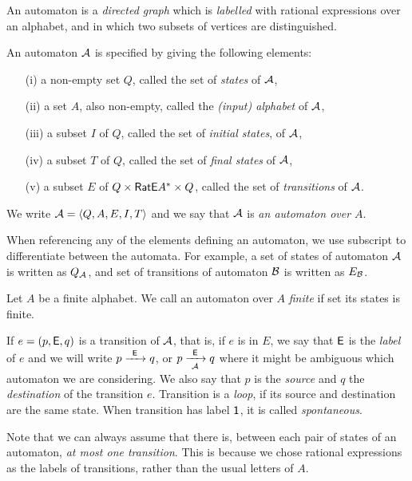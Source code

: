An automaton is a \emph{directed graph} which is \emph{labelled} with rational expressions over an alphabet, and in which two subsets of vertices are distinguished.

\begin{defn}
    An automaton ${\mathcal{A}}$ is specified by giving the following elements:
    \begin{itemize}
        \item[(i)] a non-empty set $Q$, called the set of \emph{states} of ${\mathcal{A}}$,
        \item[(ii)] a set $A$, also non-empty, called the \emph{(input) alphabet} of ${\mathcal{A}}$,
        \item[(iii)] a subset $I$ of $Q$, called the set of \emph{initial states}, of ${\mathcal{A}}$,
        \item[(iv)] a subset $T$ of $Q$, called the set of \emph{final states} of ${\mathcal{A}}$,
        \item[(v)] a subset $E$ of $Q \times {\mathsf{RatE}} A^* \times Q$, called the set of \emph{transitions} of ${\mathcal{A}}$.
    \end{itemize}
    We write ${\mathcal{A}} = \langle Q, A, E, I, T \rangle$ and we say that ${\mathcal{A}}$ is \emph{an automaton over $A$}.
\end{defn}

When referencing any of the elements defining an automaton, we use subscript to differentiate between the automata. For example, a set of states of automaton ${\mathcal{A}}$ is written as $Q_{{\mathcal{A}}}$, and set of transitions of automaton ${\mathcal{B}}$ is written as $E_{{\mathcal{B}}}$.

Let $A$ be a finite alphabet. We call an automaton over $A$ \emph{finite} if set its states is finite.

If $e = (p, {\mathsf{E}}, q)$ is a transition of ${\mathcal{A}}$, that is, if $e$ is in $E$, we say that ${\mathsf{E}}$ is the \emph{label} of $e$ and we will write $p {\; \xrightarrow[]{\: \; {\mathsf{E}} \: \;} \;} q$, or $p {\; \xrightarrow[{\mathcal{A}}]{\: \; {\mathsf{E}} \: \;} \;} q$ where it might be ambiguous which automaton we are considering. We also say that $p$ is the \emph{source} and $q$ the \emph{destination} of the transition $e$. Transition is a \emph{loop}, if its source and destination are the same state. When transition has label ${\mathsf{1}}$, it is called \emph{spontaneous}.

Note that we can always assume that there is, between each pair of states of an automaton, \emph{at most one transition}. This is because we chose rational expressions as the labels of transitions, rather than the usual letters of $A$.

